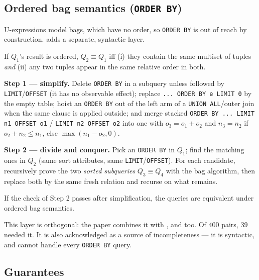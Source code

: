 \subsection{Ordered bag semantics (\lstinline|ORDER BY|)}

U-expressions model bags, which have no order, so \lstinline|ORDER BY| is out of reach by
construction. \sqlsolver{} adds a separate, syntactic layer.

\begin{definition}
If $Q_1$'s result is ordered, $Q_2\equiv Q_1$ iff (i) they contain the same multiset of
tuples \emph{and} (ii) any two tuples appear in the same relative order in both.
\end{definition}

\textbf{Step 1 --- simplify.} Delete \lstinline|ORDER BY| in a subquery unless followed by
\lstinline|LIMIT|/\lstinline|OFFSET| (it has no observable effect); replace
\lstinline|... ORDER BY e LIMIT 0| by the empty table; hoist an \lstinline|ORDER BY| out of
the left arm of a \lstinline|UNION ALL|/outer join when the same clause is applied outside;
and merge stacked \lstinline|ORDER BY ... LIMIT n1 OFFSET o1| / \lstinline|LIMIT n2 OFFSET o2|
into one with $o_3=o_1+o_2$ and $n_3 = n_2$ if $o_2+n_2\le n_1$, else $\max(n_1-o_2,0)$.

\textbf{Step 2 --- divide and conquer.} Pick an \lstinline|ORDER BY| in $Q_1$; find the
matching ones in $Q_2$ (same sort attributes, same \lstinline|LIMIT|/\lstinline|OFFSET|). For
each candidate, recursively prove the two \emph{sorted subqueries} $Q_3\equiv Q_4$ with the
bag algorithm, then replace both by the same fresh relation and recurse on what remains.

\begin{theorem}
If the check of Step 2 passes after simplification, the queries are equivalent under ordered
bag semantics.
\end{theorem}

\begin{remark}
This layer is orthogonal: the paper combines it with \udp{}, \spes{} and \wetune{} too. Of
$400$ pairs, $39$ needed it. It is also acknowledged as a source of incompleteness --- it is
syntactic, and cannot handle every \lstinline|ORDER BY| query.
\end{remark}

\subsection{Guarantees}

